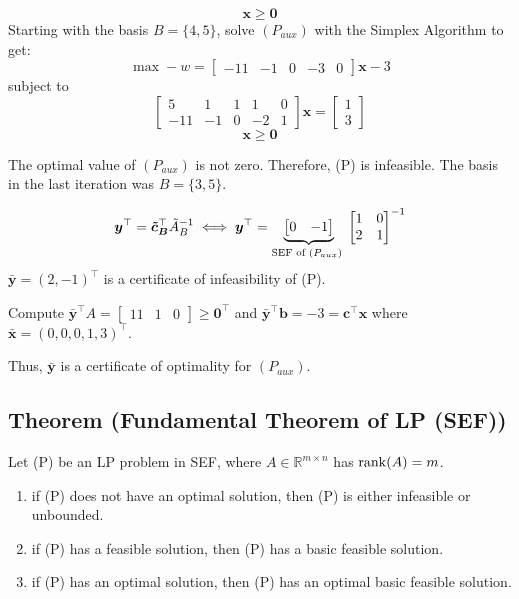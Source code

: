 \[ \bm{x}\ge \bm{0} \]
Starting with the basis $ B=\{4,5\} $, solve $ (P_{aux}) $
with the Simplex Algorithm to get:
\[ \max -w=\begin{bmatrix}-11 & -1 & 0 & -3 & 0\end{bmatrix} \bm{x} - 3 \]
subject to
\[
    \begin{bmatrix}
        5 & 1 & 1 & 1 & 0\\
        -11 & -1 & 0 & -2 & 1
    \end{bmatrix}
    \bm{x}=
    \begin{bmatrix}
        1\\
        3
    \end{bmatrix}
\]
\[ \bm{x}\ge \bm{0} \]

The optimal value of $ (P_{aux}) $ is not zero. Therefore, (P) is
infeasible. The basis in the last iteration was $ B=\{3,5\} $.

\[ \bm{y}^\top =\bm{\tilde{c}_B}^\top\tilde{A}_B^{-1} \iff 
\bm{y}^\top
=
\underbrace{\begin{bmatrix}0 & -1\end{bmatrix}}_
    {\text{SEF of $ (P_{aux}) $ }}
\begin{bmatrix}
    1 & 0\\
    2 & 1
\end{bmatrix}^{-1}
\]
$ \bm{\bar{y}}=(2,-1)^\top $
is a certificate of infeasibility of (P).

Compute $ \bm{\bar{y}}^\top  A 
= \begin{bmatrix}11 & 1 & 0 \end{bmatrix}\ge \bm{0}^\top $ and
$ \bm{\bar{y}}^\top \bm{b}=-3=\bm{c}^\top \bm{x} $
where $ \bm{\bar{x}}=(0,0,0,1,3)^\top $.

Thus, $ \bm{\bar{y}} $ is a certificate of optimality for $ (P_{aux}) $.

\begin{thmbox}
    \subsection{Theorem (Fundamental Theorem of LP (SEF))}
    Let (P) be an LP problem in SEF, where $ A\in \mathbb{R}^{m\times n} $ has $ \operatorname{rank}(A)=m $.
    \begin{enumerate}[(1)]
        \item if (P) does not have an optimal solution, then (P) is either infeasible or unbounded.
        \item if (P) has a feasible solution, then (P) has a basic feasible solution.
        \item if (P) has an optimal solution, then (P) has an optimal basic feasible solution.
    \end{enumerate}
\end{thmbox}